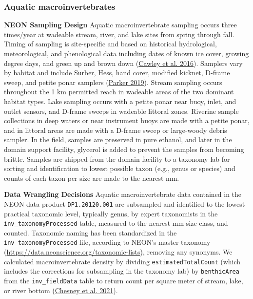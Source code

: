 \documentclass[
  12pt,
]{article}
\begin{document}
\hypertarget{aquatic-macroinvertebrates}{%
\subsubsection{Aquatic macroinvertebrates}\label{aquatic-macroinvertebrates}}

\textbf{NEON Sampling Design} Aquatic macroinvertebrate sampling occurs three times/year at wadeable stream, river, and lake sites from spring through fall. Timing of sampling is site-specific and based on historical hydrological, meteorological, and phenological data including dates of known ice cover, growing degree days, and green up and brown down (\protect\hyperlink{ref-Cawley2016}{Cawley et al. 2016}). Samplers vary by habitat and include Surber, Hess, hand corer, modified kicknet, D-frame sweep, and petite ponar samplers (\protect\hyperlink{ref-Parker2019}{Parker 2019}). Stream sampling occurs throughout the 1 km permitted reach in wadeable areas of the two dominant habitat types. Lake sampling occurs with a petite ponar near buoy, inlet, and outlet sensors, and D-frame sweeps in wadeable littoral zones. Riverine sample collections in deep waters or near instrument buoys are made with a petite ponar, and in littoral areas are made with a D-frame sweep or large-woody debris sampler. In the field, samples are preserved in pure ethanol, and later in the domain support facility, glycerol is added to prevent the samples from becoming brittle. Samples are shipped from the domain facility to a taxonomy lab for sorting and identification to lowest possible taxon (e.g., genus or species) and counts of each taxon per size are made to the nearest mm.

\textbf{Data Wrangling Decisions} Aquatic macroinvertebrate data contained in the NEON data product \texttt{DP1.20120.001} are subsampled and identified to the lowest practical taxonomic level, typically genus, by expert taxonomists in the \texttt{inv\_taxonomyProcessed} table, measured to the nearest mm size class, and counted. Taxonomic naming has been standardized in the \texttt{inv\_taxonomyProcessed} file, according to NEON's master taxonomy (\url{https://data.neonscience.org/taxonomic-lists}), removing any synonyms. We calculated macroinvertebrate density by dividing \texttt{estimatedTotalCount} (which includes the corrections for subsampling in the taxonomy lab) by \texttt{benthicArea} from the \texttt{inv\_fieldData} table to return count per square meter of stream, lake, or river bottom (\protect\hyperlink{ref-Chesney2021}{Chesney et al. 2021}).
\end{document}

